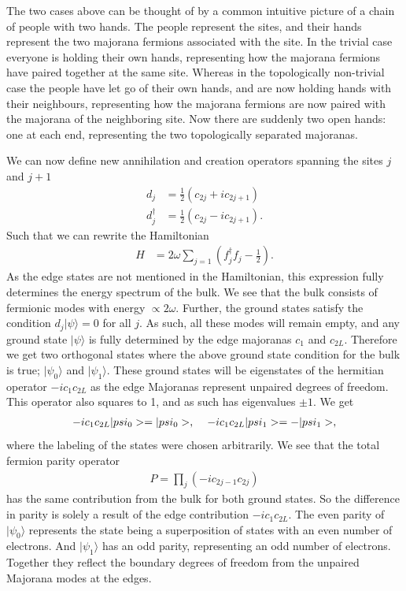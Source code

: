 The two cases above can be thought of by a common intuitive picture of a chain of people with two hands. The people represent the sites, and their hands represent the two majorana fermions associated with the site. In the trivial case everyone is holding their own hands, representing how the majorana fermions have paired together at the same site. Whereas in the topologically non-trivial case the people have let go of their own hands, and are now holding hands with their neighbours, representing how the majorana fermions are now paired with the majorana of the neighboring site. Now there are suddenly two open hands: one at each end, representing the two topologically separated majoranas.

We can now define new annihilation and creation operators spanning the sites $j$ and $j+1$
\begin{align}
    d_j &= \frac{1}{2} \left(c_{2j} + i c_{2j+1} \right) \\
    d_j^\dagger &= \frac{1}{2} \left(c_{2j} - i c_{2j+1} \right). \label{eq:define_dj}
\end{align}
Such that we can rewrite the Hamiltonian 
\begin{align}
    H &= 2 \omega \sum_{j = 1} \left(f_j^\dagger f_j - \frac{1}{2} \right).
\end{align}
As the edge states are not mentioned in the Hamiltonian, this expression fully determines the energy spectrum of the bulk. We see that the bulk consists of fermionic modes with energy $\propto 2\omega$. Further, the ground states satisfy the condition $d_j |\psi \rangle = 0 $ for all $j$. As such, all these modes will remain empty, and any ground state $|\psi \rangle $ is fully determined by the edge majoranas $c_1$ and $c_{2L}$. Therefore we get two orthogonal states where the above ground state condition for the bulk is true; $|\psi_0\rangle$ and $|\psi_1 \rangle$. These ground states will be eigenstates of the hermitian operator $-i c_{1} c_{2L}$ as the edge Majoranas represent unpaired degrees of freedom. This operator also squares to 1, and as such has eigenvalues $\pm 1$. We get 
\begin{align}
    - i c_{1} c_{2L} |\psi_0 \rangle = |\psi_0\rangle, \hspace{4mm} - i c_{1} c_{2L} |\psi_1 \rangle = -|\psi_1\rangle,
\end{align}
where the labeling of the states were chosen arbitrarily. We see that the total fermion parity operator
\begin{align}
    P = \prod_j \left(- i c_{2j-1} c_{2j} \right)
\end{align}
has the same contribution from the bulk for both ground states. So the difference in parity is solely a result of the edge contribution $-i c_1 c_{2L}$. The even parity of $|\psi_0 \rangle$ represents the state being a superposition of states with an even number of electrons. And $|\psi_1 \rangle$ has an odd parity, representing an odd number of electrons. Together they reflect the boundary degrees of freedom from the unpaired Majorana modes at the edges. 

